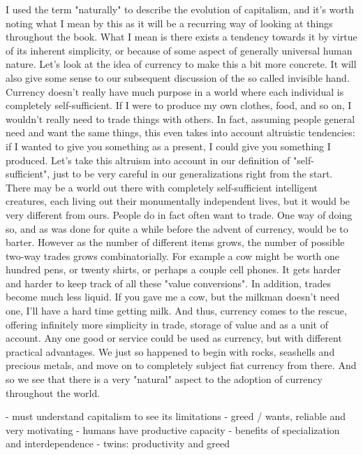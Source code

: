 \documentclass[12pt]{memoir}
\begin{document}
			I used the term "naturally" to describe the evolution of capitalism, and it's worth noting what I mean by this as it will be a recurring way of looking at things throughout the book. What I mean is 
			there exists a tendency towards it by virtue of its inherent simplicity, or because of some aspect of generally universal human nature. Let's look at the idea of currency to make this a bit more 
			concrete. It will also give some sense to our subsequent discussion of the so called invisible hand. Currency doesn't really have much purpose in a world where each individual is completely 
			self-sufficient. If I were to produce my own clothes, food, and so on, I wouldn't really need to trade things with others. In fact, assuming people general need and want the same things, this even takes 
			into account altruistic tendencies: if I wanted to give you something as a present, I could give you something I produced. Let's take this altruism into account in our definition of "self-sufficient", just to be 
			very careful in our generalizations right from the start. There may be a world out there with completely self-sufficient intelligent creatures, each living out their monumentally independent lives, but it 
			would be very different from ours. People do in fact often want to trade. One way of doing so, and as was done for quite a while before the advent of currency, would be to barter. However as the 
			number of different items grows, the number of possible two-way trades grows combinatorially. For example a cow might be worth one hundred pens, or twenty shirts, or perhaps a couple cell phones. It 
			gets harder and harder to keep track of all these "value conversions". In addition, trades become much less liquid. If you gave me a cow, but the milkman doesn't need one, I'll have a hard time getting milk. 
			And thus, currency comes to the rescue, offering infinitely more simplicity in trade, storage of value and as a unit of account. Any one good or service could be used as currency, but with different 
			practical advantages. We just so happened to begin with rocks, seashells and precious metals, and move on to completely subject fiat currency from there. And so we see that there is a very "natural" aspect 
			to the adoption of currency throughout the world.
			
			
			- must understand capitalism to see its limitations
			- greed / wants, reliable and very motivating
			- humans have productive capacity
			- benefits of specialization and interdependence
			- twins: productivity and greed
			
\end{document}

